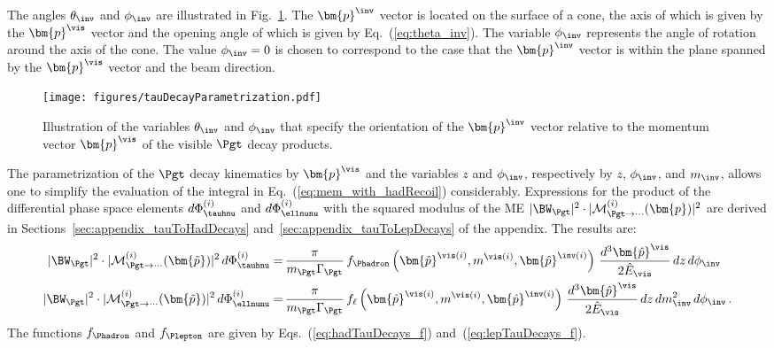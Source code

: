 The angles $\theta_{\inv}$ and $\phi_{\inv}$ are illustrated in Fig.~\ref{fig:tauDecayParametrization}.
The $\bm{p}^{\inv}$ vector is located on the surface of a cone,
the axis of which is given by the $\bm{p}^{\vis}$ vector and the
opening angle of which is given by Eq.~(\ref{eq:theta_inv}).
The variable $\phi_{\inv}$ represents the angle of rotation around the
axis of the cone.
The value $\phi_{\inv} = 0$ is chosen to correspond to the case that
the $\bm{p}^{\inv}$ vector is within the plane spanned by the
$\bm{p}^{\vis}$ vector and the beam direction.

\begin{figure}[h]
\begin{center}
\texttt{[image: figures/tauDecayParametrization.pdf]}
\end{center}
\caption{
  Illustration of the variables $\theta_{\inv}$ and $\phi_{\inv}$ that specify the orientation of the $\bm{p}^{\inv}$ vector
  relative to the momentum vector $\bm{p}^{\vis}$ of the visible $\Pgt$ decay products.
}
\label{fig:tauDecayParametrization}
\end{figure} 

The parametrization of the $\Pgt$ decay kinematics by $\bm{p}^{\vis}$
and the variables $z$ and $\phi_{\inv}$, respectively by $z$, $\phi_{\inv}$, and $m_{\inv}$,
allows one to simplify the evaluation of the integral in Eq.~(\ref{eq:mem_with_hadRecoil}) considerably.
Expressions for the product of the differential phase space elements
$d\Phi^{(i)}_{\tauhnu}$  and $d\Phi^{(i)}_{\ellnunu}$ with the squared
modulus of the ME $\vert \BW_{\Pgt} \vert^{2} \cdot \vert \mathcal{M}^{(i)}_{\Pgt\to\cdots}(\bm{p}) \vert^{2}$ are derived in Sections~\ref{sec:appendix_tauToHadDecays} and~\ref{sec:appendix_tauToLepDecays} of the appendix.
The results are:
\begin{align}
\vert \BW_{\Pgt} \vert^{2} \cdot \vert \mathcal{M}^{(i)}_{\Pgt\to\cdots}(\bm{\tilde{p}}) \vert^{2} \, d\Phi^{(i)}_{\tauhnu} 
 = & \, \frac{\pi}{m_{\Pgt}\Gamma_{\Pgt}} \,
 f_{\Phadron}\left(\bm{\hat{p}}^{\vis(i)}, m^{\vis(i)},
   \bm{\hat{p}}^{\inv(i)}\right) \, \frac{d^{3}\bm{\hat{p}}^{\vis}}{2 \hat{E}_{\vis}} \, dz \, d\phi_{\inv} \nonumber \\
\vert \BW_{\Pgt} \vert^{2} \cdot \vert \mathcal{M}^{(i)}_{\Pgt\to\cdots}(\bm{\tilde{p}}) \vert^{2} \, d\Phi^{(i)}_{\ellnunu} 
 = & \, \frac{\pi}{m_{\Pgt}\Gamma_{\Pgt}} \, f_{\ell}\left(\bm{\hat{p}}^{\vis(i)},
 m^{\vis(i)}, \bm{\hat{p}}^{\inv(i)}\right) \, \frac{d^{3}\bm{\hat{p}}^{\vis}}{2 \hat{E}_{\vis}} \, dz \, dm^{2}_{\inv} \, d\phi_{\inv}
 \, .
\label{eq:PSint}
\end{align}
The functions $f_{\Phadron}$ and $f_{\Plepton}$ are given by
Eqs.~(\ref{eq:hadTauDecays_f})
and~(\ref{eq:lepTauDecays_f}).

